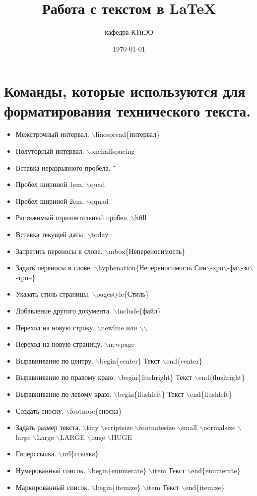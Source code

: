 \documentclass[a4paper,12pt]{article} %
\author{кафедра КТиЭО}
\title{Работа с текстом в \LaTeX{}}
\date{\today}
\begin{document}
\section{Команды, которые используются для форматирования технического текста.}
\begin{itemize}
    \item Межстрочный интервал. $\backslash$linespread\{интервал\}
    \item Полуторный интервал. $\backslash$onehalfspacing
    \item Вставка неразрывного пробела. \~ \
    \item Пробел шириной 1em.  $\backslash$quad
    \item Пробел шириной 2em.  $\backslash$qquad
    \item Растяжимый горизонтальный пробел. $\backslash$hfill
    \item Вставка текущей даты. $\backslash$today
    \item Запретить переносы в слове. $\backslash$mbox\{Непереносимость\}
    \item Задать переносы в слове. $\backslash$hyphenation\{Непереносимость Син$\backslash$-хро$\backslash$-фа$\backslash$-зо$\backslash$-трон\}
    \item Указать стиль страницы. $\backslash$pagestyle\{Стиль\}
    \item Добавление другого документа. $\backslash$include\{файл\}

    \item Переход на новую строку. $\backslash$newline или $\backslash$$\backslash$
    \item Переход на новую страницу. $\backslash$newpage
    \item Выравнивание по центру. $\backslash$begin\{center\} Текст $\backslash$end\{center\}

    \item Выравнивание по правому краю. $\backslash$begin\{flushright\} Текст $\backslash$end\{flushright\}
    \item Выравнивание по левому краю. $\backslash$begin\{flushleft\} Текст $\backslash$end\{flushleft\}
    \item Создать сноску. $\backslash$footnote\{сноска\}
    \item Задать размер текста. $\backslash$tiny $\backslash$scriptsize $\backslash$footnotesize $\backslash$small $\backslash$normalsize $\backslash$large $\backslash$Large $\backslash$LARGE $\backslash$huge $\backslash$HUGE
    \item Гиперссылка. $\backslash$url\{ссылка\}
    \item Нумерованный список. $\backslash$begin\{enumerate\} $\backslash$item Текст $\backslash$end\{enumerate\}
    \item Маркированный список. $\backslash$begin\{itemize\} $\backslash$item Текст $\backslash$end\{itemize\}
\end{itemize}
\end{document}
